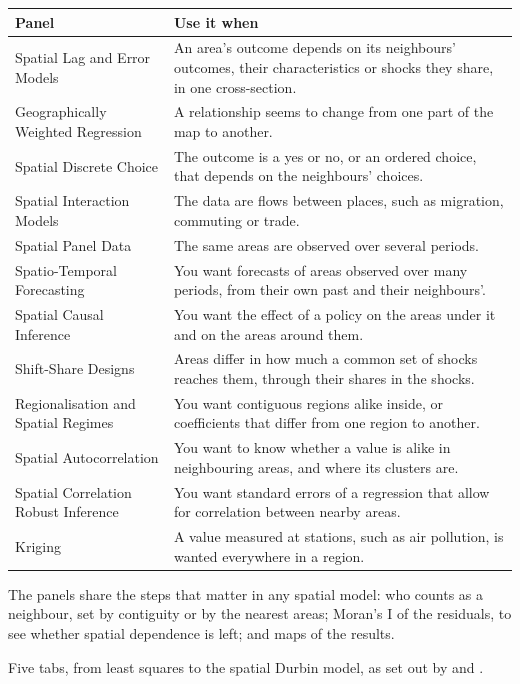 \medskip
{\small
\begin{tabularx}{\linewidth}{@{}>{\raggedright\arraybackslash}p{56mm}X@{}}
\toprule
\textbf{Panel} & \textbf{Use it when} \\\midrule
Spatial Lag and Error Models & An area's outcome depends on its neighbours' outcomes, their characteristics or shocks they share, in one cross-section. \\
Geographically Weighted Regression & A relationship seems to change from one part of the map to another. \\
Spatial Discrete Choice & The outcome is a yes or no, or an ordered choice, that depends on the neighbours' choices. \\
Spatial Interaction Models & The data are flows between places, such as migration, commuting or trade. \\
Spatial Panel Data & The same areas are observed over several periods. \\
Spatio-Temporal Forecasting & You want forecasts of areas observed over many periods, from their own past and their neighbours'. \\
Spatial Causal Inference & You want the effect of a policy on the areas under it and on the areas around them. \\
Shift-Share Designs & Areas differ in how much a common set of shocks reaches them, through their shares in the shocks. \\
Regionalisation and Spatial Regimes & You want contiguous regions alike inside, or coefficients that differ from one region to another. \\
Spatial Autocorrelation & You want to know whether a value is alike in neighbouring areas, and where its clusters are. \\
Spatial Correlation Robust Inference & You want standard errors of a regression that allow for correlation between nearby areas. \\
Kriging & A value measured at stations, such as air pollution, is wanted everywhere in a region. \\\bottomrule
\end{tabularx}}

\medskip
The panels share the steps that matter in any spatial model: who counts as a neighbour, set by contiguity or by the nearest areas; Moran's I of the residuals, to see whether spatial dependence is left; and maps of the results.

Five tabs, from least squares to the spatial Durbin model, as set out by  and .

